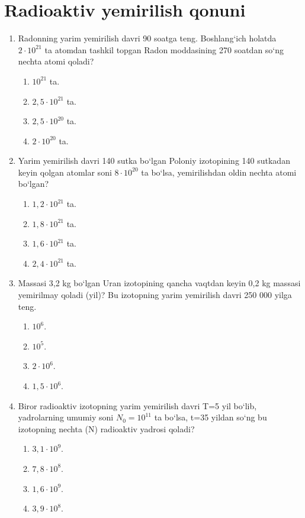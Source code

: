 \section{Radioaktiv yemirilish qonuni}


\begin{enumerate}

\item Radonning yarim yemirilish davri 90 soatga teng. Boshlang‘ich holatda $2\cdot 10^{21}$ ta atomdan tashkil topgan Radon moddasining 270 soatdan so‘ng nechta atomi qoladi?
\begin{enumerate}[label=\Alph*)]
\item $10^{21}$ ta.
\item $2,5\cdot 10^{21}$ ta.
\item $2,5\cdot 10^{20}$ ta.
\item $2\cdot 10^{20}$ ta.
\end{enumerate}

\item Yarim yemirilish davri 140 sutka bo‘lgan Poloniy izotopining 140 sutkadan keyin qolgan atomlar soni $8\cdot 10^{20}$ ta bo‘lsa, yemirilishdan oldin nechta atomi bo‘lgan?
\begin{enumerate}[label=\Alph*)]
\item $1,2\cdot 10^{21}$ ta.
\item $1,8\cdot 10^{21}$ ta.
\item $1,6\cdot 10^{21}$ ta.
\item $2,4\cdot 10^{21}$ ta.
\end{enumerate}

\item Massasi 3,2 kg bo‘lgan Uran izotopining qancha vaqtdan keyin 0,2 kg massasi yemirilmay qoladi (yil)? Bu izotopning yarim yemirilish davri 250 000 yilga teng.
\begin{enumerate}[label=\Alph*)]
\item $10^6$.
\item $10^5$.
\item $2\cdot 10^6$.
\item $1,5\cdot 10^6$.
\end{enumerate}

\item Biror radioaktiv izotopning yarim yemirilish davri T=5 yil bo‘lib, yadrolarning umumiy soni $N_0=10^{11}$ ta bo‘lsa, t=35 yildan so‘ng bu izotopning nechta (N) radioaktiv yadrosi qoladi?
\begin{enumerate}[label=\Alph*)]
\item $3,1\cdot 10^9$.
\item $7,8\cdot 10^8$.
\item $1,6\cdot 10^9$.
\item $3,9\cdot 10^8$.
\end{enumerate}


\end{enumerate}
